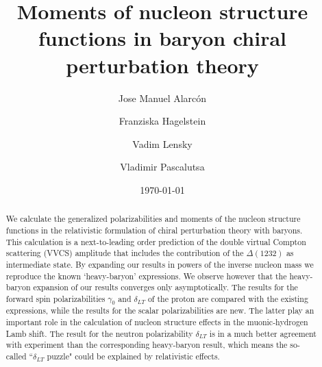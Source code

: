 \documentclass[prc,twocolumn,showpacs,preprintnumbers,amsmath,amssymb
,superscriptaddress,a4paper,nofootinbib
]{revtex4-1}
\begin{document}
\title {Moments of nucleon structure functions in baryon chiral perturbation theory}
\author{Jose Manuel Alarc\'on}
\author{Franziska Hagelstein}
\author{Vadim Lensky}
\author{Vladimir Pascalutsa}

\begin{abstract}
We calculate the generalized polarizabilities and moments of the nucleon structure functions in the relativistic formulation of chiral perturbation theory with baryons. 
This calculation is a next-to-leading order prediction of the double virtual Compton scattering (VVCS) amplitude that includes the contribution of the $\Delta(1232)$ as intermediate state.
By expanding our results in powers of the inverse nucleon  mass
we reproduce the known `heavy-baryon' expressions. We
observe however that the heavy-baryon expansion of our results
converges only asymptotically. The results for the
forward spin polarizabilities $\gamma_0$ and $\delta_{LT}$
of the proton are compared with the existing expressions, while the results
for the scalar polarizabilities are new. The latter play an
important role in the calculation of nucleon structure 
effects in the muonic-hydrogen Lamb shift. 
The result for the neutron polarizability $\delta_{LT}$
is in a much better agreement with experiment than 
the corresponding heavy-baryon result, which means
the so-called ``$\delta_{LT}$ puzzle" could be explained
by relativistic effects.
\end{abstract}
\date{\today}
\maketitle
\end{document}
